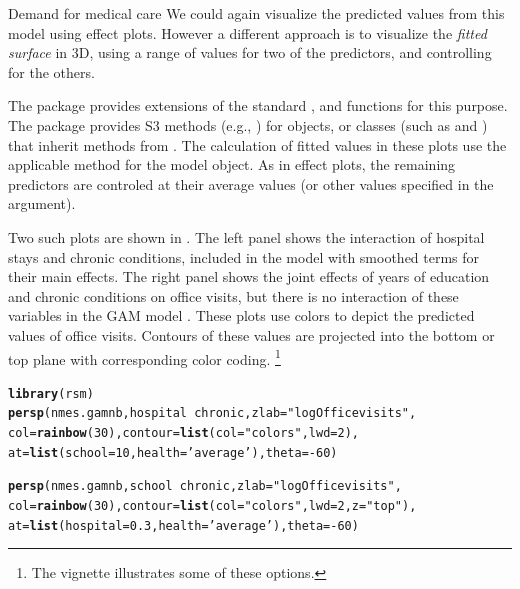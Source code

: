 \documentclass[11pt]{book}\usepackage[]{graphicx}\usepackage[]{color}
\makeatletter
\newcommand{\hlnum}[1]{\textcolor[rgb]{0.686,0.059,0.569}{#1}}%
\newcommand{\hlstr}[1]{\textcolor[rgb]{0.192,0.494,0.8}{#1}}%
\newcommand{\hlopt}[1]{\textcolor[rgb]{0,0,0}{#1}}%
\newcommand{\hlstd}[1]{\textcolor[rgb]{0.345,0.345,0.345}{#1}}%
\newcommand{\hlkwc}[1]{\textcolor[rgb]{0.333,0.667,0.333}{#1}}%
\newcommand{\hlkwd}[1]{\textcolor[rgb]{0.737,0.353,0.396}{\textbf{#1}}}%
\newenvironment{kframe}{%
 \def\at@end@of@kframe{}%
 \ifinner\ifhmode%
  \def\at@end@of@kframe{\end{minipage}}%
  \begin{minipage}{\columnwidth}%
 \fi\fi%
 \def\FrameCommand##1{\hskip\@totalleftmargin \hskip-\fboxsep
 \colorbox{shadecolor}{##1}\hskip-\fboxsep
     \hskip-\linewidth \hskip-\@totalleftmargin \hskip\columnwidth}%
 \MakeFramed {\advance\hsize-\width
   \@totalleftmargin\z@ \linewidth\hsize
   \@setminipage}}%
 {\par\unskip\endMakeFramed%
 \at@end@of@kframe}
\newenvironment{knitrout}{}{} %
\renewenvironment{knitrout}{\small\renewcommand{\baselinestretch}{.85}}{} %
\makeatother
\begin{document}
\begin{Example}[nmes3]{Demand for medical care}
We could again visualize the predicted values from this model using effect plots. However a
different approach is to visualize the \emph{fitted surface} in 3D, using a range of
values for two of the predictors, and controlling for the others.

The  package provides extensions of the standard , 
and  functions for this purpose.  The package provides S3 methods 
(e.g., ) for
 objects, or classes (such as  and )
that inherit methods from .  The calculation of fitted values in these
plots use the applicable  method for the model object.
As in effect plots, the remaining predictors are controled at their average
values (or other values specified in the  argument).

Two such plots are shown in . The left panel shows the interaction of 
hospital stays and chronic conditions, included in the model with smoothed terms for their
main effects.  The right panel shows the joint effects of years of education and chronic
conditions on office visits, but there is no interaction of these variables in the GAM model
. 
These plots use  colors to depict the predicted values of office visits.
Contours of these values are projected into the bottom or top plane with corresponding
color coding.%
\footnote{The vignette  illustrates some of these options.
}
\begin{knitrout}
\color{fgcolor}\begin{kframe}
\begin{alltt}
\hlkwd{library}\hlstd{(rsm)}
\hlkwd{persp}\hlstd{(nmes.gamnb, hospital} \hlopt{~} \hlstd{chronic,} \hlkwc{zlab}\hlstd{=}\hlstr{"log Office visits"}\hlstd{,}
  \hlkwc{col}\hlstd{=}\hlkwd{rainbow}\hlstd{(}\hlnum{30}\hlstd{),} \hlkwc{contour}\hlstd{=}\hlkwd{list}\hlstd{(}\hlkwc{col}\hlstd{=}\hlstr{"colors"}\hlstd{,} \hlkwc{lwd}\hlstd{=}\hlnum{2}\hlstd{),}
  \hlkwc{at}\hlstd{=}\hlkwd{list}\hlstd{(}\hlkwc{school}\hlstd{=}\hlnum{10}\hlstd{,} \hlkwc{health}\hlstd{=}\hlstr{'average'}\hlstd{),} \hlkwc{theta}\hlstd{=}\hlopt{-}\hlnum{60}\hlstd{)}

\hlkwd{persp}\hlstd{(nmes.gamnb, school} \hlopt{~} \hlstd{chronic,} \hlkwc{zlab}\hlstd{=}\hlstr{"log Office visits"}\hlstd{,}
        \hlkwc{col}\hlstd{=}\hlkwd{rainbow}\hlstd{(}\hlnum{30}\hlstd{),} \hlkwc{contour}\hlstd{=}\hlkwd{list}\hlstd{(}\hlkwc{col}\hlstd{=}\hlstr{"colors"}\hlstd{,} \hlkwc{lwd}\hlstd{=}\hlnum{2}\hlstd{,} \hlkwc{z}\hlstd{=}\hlstr{"top"}\hlstd{),}
  \hlkwc{at}\hlstd{=}\hlkwd{list}\hlstd{(}\hlkwc{hospital}\hlstd{=}\hlnum{0.3}\hlstd{,} \hlkwc{health}\hlstd{=}\hlstr{'average'}\hlstd{),} \hlkwc{theta}\hlstd{=}\hlopt{-}\hlnum{60}\hlstd{)}
\end{alltt}
\end{kframe}\begin{figure}[!htbp]



\end{figure}
\end{knitrout}
\end{Example}
\end{document}
